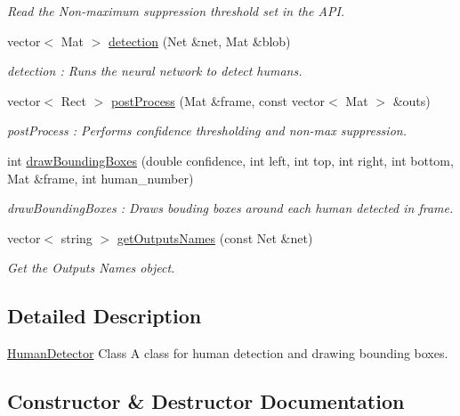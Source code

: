 \begin{DoxyCompactItemize}
\begin{DoxyCompactList}\small\item\em Read the Non-\/maximum suppression threshold set in the A\+PI. \end{DoxyCompactList}\item 
vector$<$ Mat $>$ \hyperlink{classHumanDetector_a54b25d621a57b068d4e069ce68ad944e}{detection} (Net \&net, Mat \&blob)
\begin{DoxyCompactList}\small\item\em detection \+: Runs the neural network to detect humans. \end{DoxyCompactList}\item 
vector$<$ Rect $>$ \hyperlink{classHumanDetector_a2246eb43446bfb27f8af71842b0e8215}{post\+Process} (Mat \&frame, const vector$<$ Mat $>$ \&outs)
\begin{DoxyCompactList}\small\item\em post\+Process \+: Performs confidence thresholding and non-\/max suppression. \end{DoxyCompactList}\item 
int \hyperlink{classHumanDetector_a798818fd11991551c1c6a68ae13f6321}{draw\+Bounding\+Boxes} (double confidence, int left, int top, int right, int bottom, Mat \&frame, int human\+\_\+number)
\begin{DoxyCompactList}\small\item\em draw\+Bounding\+Boxes \+: Draws bouding boxes around each human detected in frame. \end{DoxyCompactList}\item 
vector$<$ string $>$ \hyperlink{classHumanDetector_a0f42d17cfa9381ce20224fe3ffd25f28}{get\+Outputs\+Names} (const Net \&net)
\begin{DoxyCompactList}\small\item\em Get the Outputs Names object. \end{DoxyCompactList}\end{DoxyCompactItemize}


\subsection{Detailed Description}
\hyperlink{classHumanDetector}{Human\+Detector} Class A class for human detection and drawing bounding boxes. 

\subsection{Constructor \& Destructor Documentation}
\mbox{\label{classHumanDetector_a6a814e1705029576a7cb57a5727482e7}} 
